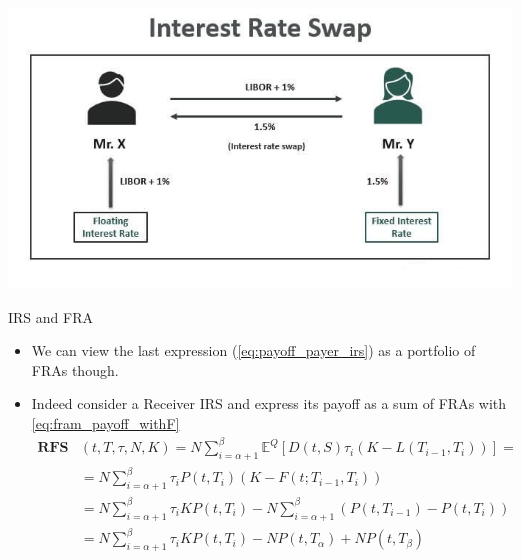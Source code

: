 \documentclass{beamer}
\begin{document}
\begin{frame}{}
\begin{center}
	\includegraphics[width=0.9\linewidth]{Interest-Rate-Swap-diagram}
\end{center}
\end{frame}

\begin{frame}{IRS and FRA}
	\begin{itemize}
		\item We can view the last expression (\cref{eq:payoff_payer_irs}) as a portfolio of FRAs though.
		\item Indeed consider a Receiver IRS and express its payoff as a sum of FRAs with \cref{eq:fram_payoff_withF}
		\begin{equation}
			\begin{aligned}
				\textbf{RFS}&(t,T,\tau,N,K) = 	N\sum_{i=\alpha+1}^{\beta}\mathbb{E}^Q[D(t,S)\tau_i(K - L(T_{i-1},T_i))]=\\
				&=N\sum_{i=\alpha+1}^{\beta}\tau_i P(t,T_i)(K-F(t;T_{i-1},T_i))\\
				&=N\sum_{i=\alpha+1}^{\beta}\tau_i KP(t,T_i)-N\sum_{i=\alpha+1}^{\beta}(P(t,T_{i-1})-P(t,T_i)) \\
				&=N\sum_{i=\alpha+1}^{\beta}\tau_i KP(t,T_i)-NP(t,T_\alpha)+NP(t,T_\beta)
			\end{aligned}
		\label{eq:swap_as_sum_fra}
		\end{equation}
	\end{itemize}
\end{frame}
\end{document}
